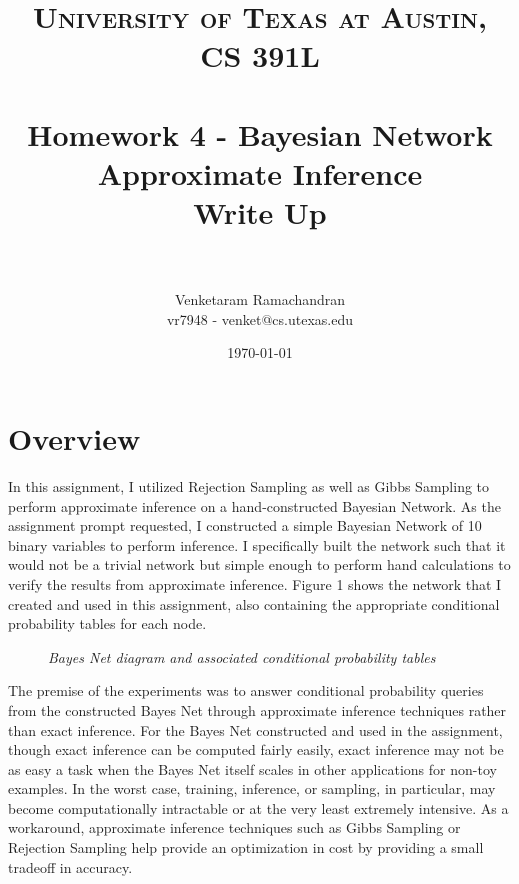 \documentclass{article} %
\title{	
\normalfont \normalsize 
\textsc{University of Texas at Austin, CS 391L} \\
\horrule{0.6pt} \\[0.4cm] %
\huge Homework 4 - Bayesian Network Approximate Inference \\[0.4cm]
\large Write Up  \\
\horrule{2pt} \\[0.5cm] %
}
\author{Venketaram Ramachandran\\
vr7948 - venket@cs.utexas.edu} %
\date{\normalsize\today} %
\begin{document}
\maketitle %

\section{Overview}

In this assignment, I utilized Rejection Sampling as well as Gibbs Sampling to perform approximate inference on a hand-constructed Bayesian Network. As the assignment prompt requested, I constructed a simple Bayesian Network of 10 binary variables to perform inference. I specifically built the network such that it would not be a trivial network but simple enough to perform hand calculations to verify the results from approximate inference. Figure 1 shows the network that I created and used in this assignment, also containing the appropriate conditional probability tables for each node.

\begin{figure}[h]%
	\centering
    	\hfill%
    \caption{\textit{Bayes Net diagram and associated conditional probability tables}}
    \label{fig:default}
\end{figure}

The premise of the experiments was to answer conditional probability queries from the constructed Bayes Net through approximate inference techniques rather than exact inference. For the Bayes Net constructed and used in the assignment, though exact inference can be computed fairly easily, exact inference may not be as easy a task when the Bayes Net itself scales in other applications for non-toy examples. In the worst case, training, inference, or sampling, in particular, may become computationally intractable or at the very least extremely intensive. As a workaround, approximate inference techniques such as Gibbs Sampling or Rejection Sampling help provide an optimization in cost by providing a small tradeoff in accuracy. 
\end{document}
